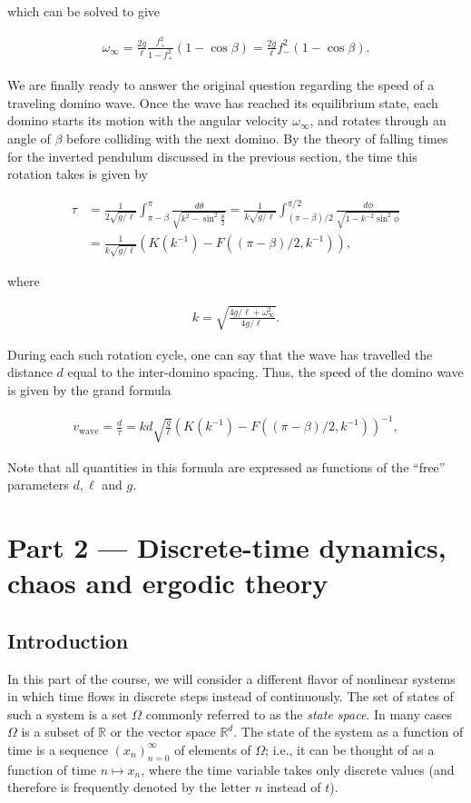 \documentclass[11pt]{report}
\theoremstyle{plain}
\theoremstyle{definition}
\begin{document}
which can be solved to give

\begin{align*}
\omega_\infty = \frac{2g}{\ell}\frac{f_+^2}{1-f_+^2}(1-\cos\beta) = \frac{2g}{\ell}f_-^2(1-\cos\beta).
\end{align*}

We are finally ready to answer the original question
regarding the speed of a traveling domino wave. Once
the wave has reached its equilibrium state, each
domino starts its motion with the angular velocity
$\omega_\infty$, and rotates through an angle of
$\beta$ before colliding with the next domino. By the
theory of falling times for the inverted pendulum
discussed in the previous section, the time this
rotation takes is given by

\begin{align*}
\tau &= \frac{1}{2\sqrt{g/\ell}} \int_{\pi-\beta}^{\pi} \frac{d\theta}{\sqrt{k^2-\sin^2\tfrac{\theta}{2}}}
= \frac{1}{k\sqrt{g/\ell}} \int_{(\pi-\beta)/2}^{\pi/2} \frac{d\phi}{\sqrt{1-k^{-2}\sin^2 \phi}} \\
&= \frac{1}{k\sqrt{g/\ell}} \left( K(k^{-1})-F((\pi-\beta)/2,k^{-1}) \right),
\end{align*}

where

\begin{align*}
k = \sqrt{\frac{4g/\ell+\omega_\infty^2}{4g/\ell}}.
\end{align*}

During each such rotation cycle, one can say that the
wave has travelled the distance $d$ equal to the
inter-domino spacing. Thus, the speed of the domino
wave is given by the grand formula

\begin{align*}
v_{\textrm{wave}} = \frac{d}{\tau} = k d \sqrt{\frac{g}{\ell}}
\left( K(k^{-1})-F((\pi-\beta)/2,k^{-1}) \right)^{-1},
\end{align*}

Note that all quantities in this formula are
expressed as functions of the ``free'' parameters
$d, \ell$ and $g$.

\chapter{Part 2 — Discrete-time dynamics, chaos and ergodic theory}

\section{Introduction}
\label{sec:ergodic-intro}
In this part of the course, we will consider a
different flavor of nonlinear systems in which time
flows in discrete steps instead of continuously. The
set of states of such a system is a set $\Omega$
commonly referred to as the \emph{state space}. In many
cases $\Omega$ is a subset of $\mathbb{R}$ or the
vector space $\mathbb{R}^d$. The state of the system
as a function of time is a sequence
$(x_n)_{n=0}^\infty$ of elements of $\Omega$; i.e.,
it can be thought of as a function of time
$n\mapsto x_n$, where the time variable takes only
discrete values (and therefore is frequently denoted
by the letter $n$ instead of $t$).
\end{document}

